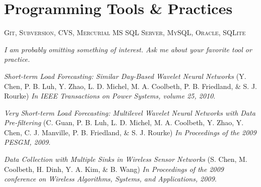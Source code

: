 \documentclass[11pt,a4paper,sans]{moderncv} %
\begin{document}
\newpage
\section{Programming Tools \& Practices}

 {\textsc{Git, Subversion, CVS, Mercurial}}
 {\textsc{MS SQL Server, MySQL, Oracle, SQLite}}

{\em I am probably omitting something of interest.  Ask me about your favorite tool or practice.}

\begin{thebibliography}{1}

	 {\em Short-term Load Forecasting: Similar Day-Based Wavelet Neural Networks}
		(Y. Chen, P. B. Luh, Y. Zhao, L. D. Michel, M. A. Coolbeth, P. B. Friedland, \& S. J. Rourke)
		{\em In IEEE Transactions on Power Systems, volume 25, 2010}.

	 {\em Very Short-term Load Forecasting: Multilevel Wavelet Neural Networks with Data
		Pre-filtering}
		(C. Guan, P. B. Luh, L. D. Michel, M. A. Coolbeth, Y. Zhao, Y. Chen, C. J. Manville, P. B. Friedland,
		\& S. J. Rourke)
		{\em In Proceedings of the 2009 PESGM, 2009}.

	 {\em Data Collection with Multiple Sinks in Wireless Sensor Networks} 
		(S. Chen, M. Coolbeth, H. Dinh, Y. A. Kim, \& B. Wang)
		{\em In Proceedings of the 2009 conference on Wireless Algorithms, Systems, and Applications, 2009}.

\end{thebibliography}
\end{document}
